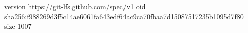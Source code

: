 version https://git-lfs.github.com/spec/v1
oid sha256:f988269d3f5c14ae6061fa643edf64ac9ca70fbaa7d15087517235b1095d7f80
size 1007
